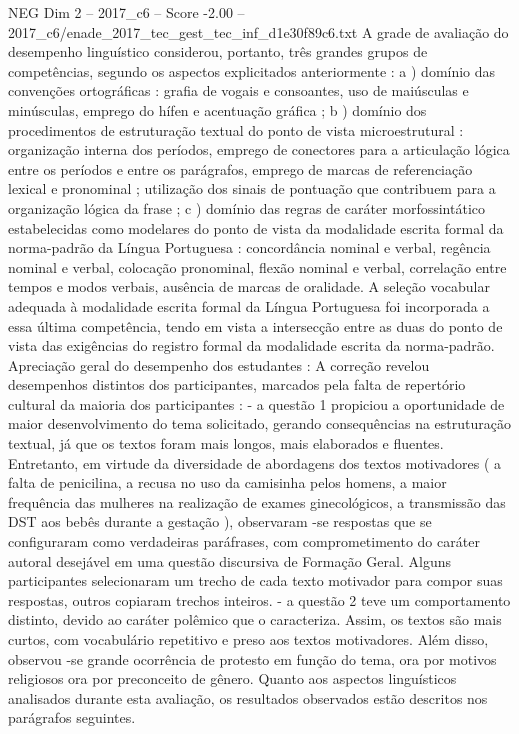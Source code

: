 \begin{textsample}{NEG Dim 2 – 2017\_c6 – Score -2.00 – 2017\_c6/enade\_2017\_tec\_gest\_tec\_inf\_d1e30f89c6.txt}
A grade de avaliação do desempenho linguístico considerou, portanto, três grandes grupos de competências, segundo os aspectos explicitados anteriormente : a ) domínio das convenções ortográficas : grafia de vogais e consoantes, uso de maiúsculas e minúsculas, emprego do hífen e acentuação gráfica ; b ) domínio dos procedimentos de estruturação textual do ponto de vista microestrutural : organização interna dos períodos, emprego de conectores para a articulação lógica entre os períodos e entre os parágrafos, emprego de marcas de referenciação lexical e pronominal ; utilização dos sinais de pontuação que contribuem para a organização lógica da frase ; c ) domínio das regras de caráter morfossintático estabelecidas como modelares do ponto de vista da modalidade escrita formal da norma-padrão da Língua Portuguesa : concordância nominal e verbal, regência nominal e verbal, colocação pronominal, flexão nominal e verbal, correlação entre tempos e modos verbais, ausência de marcas de oralidade.
A seleção vocabular adequada à modalidade escrita formal da Língua Portuguesa foi incorporada a essa última competência, tendo em vista a intersecção entre as duas do ponto de vista das exigências do registro formal da modalidade escrita da norma-padrão.
Apreciação geral do desempenho dos estudantes : A correção revelou desempenhos distintos dos participantes, marcados pela falta de repertório cultural da maioria dos participantes : - a questão 1 propiciou a oportunidade de maior desenvolvimento do tema solicitado, gerando consequências na estruturação textual, já que os textos foram mais longos, mais elaborados e fluentes.
Entretanto, em virtude da diversidade de abordagens dos textos motivadores ( a falta de penicilina, a recusa no uso da camisinha pelos homens, a maior frequência das mulheres na realização de exames ginecológicos, a transmissão das DST aos bebês durante a gestação ), observaram -se respostas que se configuraram como verdadeiras paráfrases, com comprometimento do caráter autoral desejável em uma questão discursiva de Formação Geral.
Alguns participantes selecionaram um trecho de cada texto motivador para compor suas respostas, outros copiaram trechos inteiros. - a questão 2 teve um comportamento distinto, devido ao caráter polêmico que o caracteriza.
Assim, os textos são mais curtos, com vocabulário repetitivo e preso aos textos motivadores.
Além disso, observou -se grande ocorrência de protesto em função do tema, ora por motivos religiosos ora por preconceito de gênero.
Quanto aos aspectos linguísticos analisados durante esta avaliação, os resultados observados estão descritos nos parágrafos seguintes.

\end{textsample}
